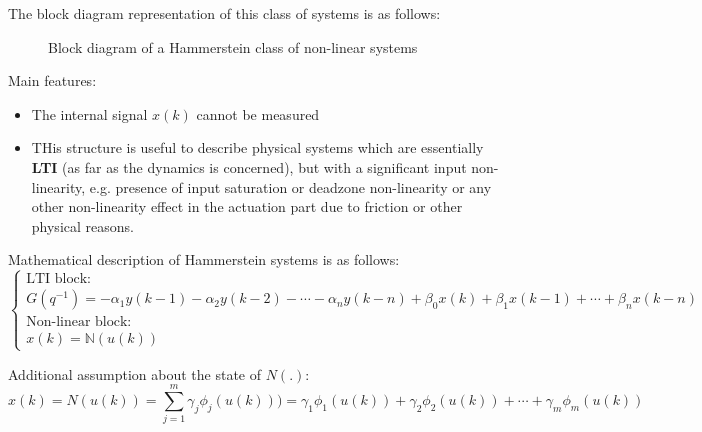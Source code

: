 The block diagram representation of this class of systems is as follows:


\begin{figure}[h!]
\centering
{}
\caption{Block diagram of a Hammerstein class of non-linear systems}
\label{fig:hammerstein}
\end{figure}

Main features:
\begin{itemize}
    \item The internal signal $x(k)$ cannot be measured
    \item THis structure is useful to describe physical systems which are essentially \textbf{LTI} (as far as the dynamics is concerned), but with a significant input non-linearity, e.g. presence of input saturation or deadzone non-linearity or any other non-linearity effect in the actuation part due to friction or other physical reasons.
\end{itemize}

Mathematical description of Hammerstein systems is as follows:
\[
\begin{cases}
\text{LTI block:}\\G(q^{-1}) = -\alpha_1y(k-1) - \alpha_2y(k-2) -\cdots -\alpha_ny(k-n)+\beta_0x(k)+\beta_1x(k-1)+\cdots + \beta_nx(k-n)\\
\text{Non-linear block:} \\x(k) = \mathbb{N}(u(k))
\end{cases}
\]

Additional assumption about the state of $N(.)$:
\[
x(k) = N(u(k)) = \sum_{j = 1}^{m}\gamma_j\phi_j(u(k))) = \gamma_1\phi_1(u(k)) + \gamma_2\phi_2(u(k)) + \cdots + \gamma_m\phi_m(u(k))
\]


